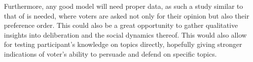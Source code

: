 Furthermore, any good model will need proper data, as such a study similar to
that of \citet{fishkinCanDeliberationHave2024} is needed, where voters are
asked not only for their opinion but also their preference order. This could
also be a great opportunity to gather qualitative insights into deliberation
and the social dynamics thereof. This would also allow for testing participant's
knowledge on topics directly, hopefully giving stronger indications of voter's ability
to persuade and defend on specific topics.

